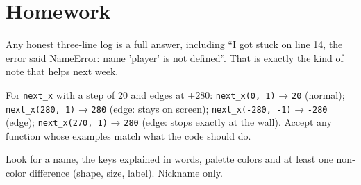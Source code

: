 \section{Homework}
\begin{answer}
Any honest three-line log is a full answer, including \enquote{I got stuck on line 14, the error
said NameError: name 'player' is not defined}. That is exactly the kind of note that helps next week.
\end{answer}

\begin{answer}
For \texttt{next\_x} with a step of 20 and edges at $\pm 280$: \texttt{next\_x(0, 1)} → \texttt{20}
(normal); \texttt{next\_x(280, 1)} → \texttt{280} (edge: stays on screen); \texttt{next\_x(-280, -1)} →
\texttt{-280} (edge); \texttt{next\_x(270, 1)} → \texttt{280} (edge: stops exactly at the wall). Accept any
function whose examples match what the code should do.
\end{answer}

\begin{answer}
Look for a name, the keys explained in words, palette colors and at least one non-color difference
(shape, size, label). Nickname only.
\end{answer}
